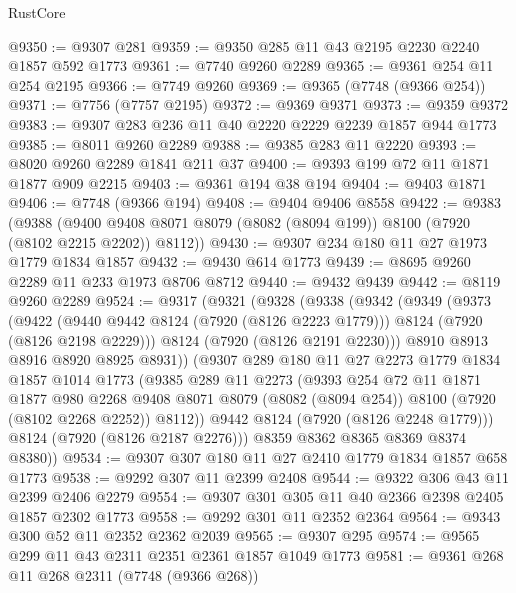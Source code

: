 \begin{lexlean}{RustCore}
\begin{coremodule}
@9350 := @9307 @281
@9359 := @9350 @285 @11 @43 @2195 @2230 @2240 @1857 @592 @1773
@9361 := @7740 @9260 @2289
@9365 := @9361 @254 @11 @254 @2195
@9366 := @7749 @9260
@9369 := @9365 (@7748 (@9366 @254))
@9371 := @7756 (@7757 @2195)
@9372 := @9369 @9371
@9373 := @9359 @9372
@9383 := @9307 @283 @236 @11 @40 @2220 @2229 @2239 @1857 @944 @1773
@9385 := @8011 @9260 @2289
@9388 := @9385 @283 @11 @2220
@9393 := @8020 @9260 @2289 @1841 @211 @37
@9400 := @9393 @199 @72 @11 @1871 @1877 @909 @2215
@9403 := @9361 @194 @38 @194
@9404 := @9403 @1871
@9406 := @7748 (@9366 @194)
@9408 := @9404 @9406 @8558
@9422 := @9383
    (@9388 (@9400 @9408 @8071 @8079 (@8082 (@8094 @199)) @8100 (@7920 (@8102 @2215 @2202)) @8112))
@9430 := @9307 @234 @180 @11 @27 @1973 @1779 @1834 @1857
@9432 := @9430 @614 @1773
@9439 := @8695 @9260 @2289 @11 @233 @1973 @8706 @8712
@9440 := @9432 @9439
@9442 := @8119 @9260 @2289
@9524 := @9317
    (@9321
      (@9328
        (@9338
          (@9342
            (@9349
              (@9373
                (@9422
                  (@9440 @9442 @8124 (@7920 (@8126 @2223 @1779)))
                  @8124
                  (@7920 (@8126 @2198 @2229)))
                @8124
                (@7920 (@8126 @2191 @2230)))
              @8910
              @8913
              @8916
              @8920
              @8925
              @8931))
          (@9307
            @289
            @180
            @11
            @27
            @2273
            @1779
            @1834
            @1857
            @1014
            @1773
            (@9385
              @289
              @11
              @2273
              (@9393
                @254
                @72
                @11
                @1871
                @1877
                @980
                @2268
                @9408
                @8071
                @8079
                (@8082 (@8094 @254))
                @8100
                (@7920 (@8102 @2268 @2252))
                @8112))
            @9442
            @8124
            (@7920 (@8126 @2248 @1779)))
          @8124
          (@7920 (@8126 @2187 @2276)))
        @8359
        @8362
        @8365
        @8369
        @8374
        @8380))
@9534 := @9307 @307 @180 @11 @27 @2410 @1779 @1834 @1857 @658 @1773
@9538 := @9292 @307 @11 @2399 @2408
@9544 := @9322 @306 @43 @11 @2399 @2406 @2279
@9554 := @9307 @301 @305 @11 @40 @2366 @2398 @2405 @1857 @2302 @1773
@9558 := @9292 @301 @11 @2352 @2364
@9564 := @9343 @300 @52 @11 @2352 @2362 @2039
@9565 := @9307 @295
@9574 := @9565 @299 @11 @43 @2311 @2351 @2361 @1857 @1049 @1773
@9581 := @9361 @268 @11 @268 @2311 (@7748 (@9366 @268))

\end{coremodule}
\end{lexlean}
